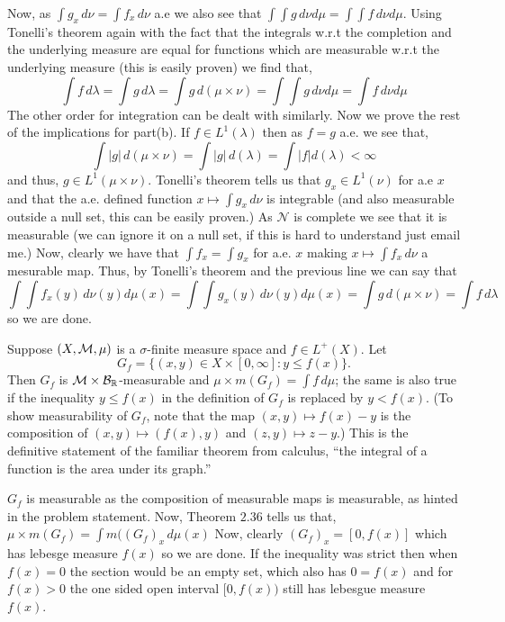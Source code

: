 \documentclass[12pt,a4paper]{article}
\begin{document}
\begin{solution}
	Now, as $\int g_x\,d\nu=\int f_x\,d\nu$ a.e we also see that $\int\int g\,d\nu d\mu=\int\int f\,d\nu d\mu$. 
	Using Tonelli's theorem again with the fact that the integrals w.r.t the completion and the underlying measure are equal for functions which are measurable w.r.t the underlying measure (this is easily proven) we find that,
	\[
	    \int f\,d\lambda=\int g\,d\lambda=\int g\,d(\mu\times\nu)=\int\int g\,d\nu d\mu=\int f\,d\nu d\mu
	\]
	The other order for integration can be dealt with similarly. 
	Now we prove the rest of the implications for part(b).
	If $f\in L^1(\lambda)$ then as $f=g$ a.e. we see that,
	\[
	    \int|g|\,d(\mu\times\nu)=\int|g|\,d(\lambda)=\int|f|d(\lambda)<\infty
	\]
	and thus, $g\in L^1(\mu\times\nu)$. 
	Tonelli's theorem tells us that $g_x\in L^1(\nu)$ for a.e $x$ and that the a.e. defined function $x\mapsto\int g_x\,d\nu$ is integrable (and also measurable outside a null set, this can be easily proven.) 
	As $\mathcal N$ is complete we see that it is measurable (we can ignore it on a null set, if this is hard to understand just email me.) 
	Now, clearly we have that $\int f_x=\int g_x$ for a.e. $x$ making $x\mapsto\int f_x\,d\nu$ a mesurable map.
	Thus, by Tonelli's theorem and the previous line we can say that
	\[
	    \int\int f_x(y)\,d\nu(y)d\mu(x)=\int\int g_x(y)\,d\nu(y)d\mu(x)=\int g\,d(\mu\times\nu)=\int f\,d\lambda
	\]
so we are done.
\end{solution}
\begin{problem}\label{prob:2-50}
Suppose $(X, \mathcal{M}, \mu)$ is a $\sigma$-finite measure space and $f \in L^+(X)$. Let
\[ G_f = \{(x, y) \in X \times [0, \infty] : y \le f(x)\}. \]
Then $G_f$ is $\mathcal{M} \times \mathcal{B}_{\mathbb{R}}$-measurable and $\mu \times m(G_f) = \int f \, d\mu$; the same is also true if the inequality $y \le f(x)$ in the definition of $G_f$ is replaced by $y < f(x)$. (To show measurability of $G_f$, note that the map $(x, y) \mapsto f(x) - y$ is the composition of $(x, y) \mapsto (f(x), y)$ and $(z, y) \mapsto z - y$.) This is the definitive statement of the familiar theorem from calculus, ``the integral of a function is the area under its graph.''
\end{problem}
\begin{solution}
    $G_f$ is measurable as the composition of measurable maps is measurable, as hinted in the problem statement. 
	Now, Theorem $2.36$ tells us that,
	$\mu\times m(G_f)=\int m((G_f)_x\,d\mu(x)$
	Now, clearly $(G_f)_x=[0,f(x)]$ which has lebesge measure $f(x)$ so we are done.
	If the inequality was strict then when $f(x)=0$ the section would be an empty set, which also has $0=f(x)$ and for $f(x)>0$ the one sided open interval $[0,f(x))$ still has lebesgue measure $f(x).$
\end{solution}
\end{document}
